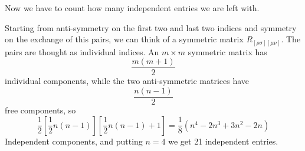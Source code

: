 Now we have to count how many independent entries we are left with.\par
Starting from anti-symmetry on the first two and last two indices and symmetry on the exchange of this pairs, we can think of a symmetric matrix $R_{[\rho \sigma ][\mu \nu ]}$. The pairs are thought as individual indices. An $m\times m$ symmetric matrix has 
\[
\frac{m\left( m+1 \right)}{2}
\]
individual components, while the two anti-symmetric matrices have
\[
\frac{n\left( n-1 \right)}{2}
\]
free components, so
\[
	\frac{1}{2} \left[ \frac{1}{2} n\left( n-1 \right)\right] \left[ \frac{1}{2} n \left( n-1 \right)+1\right] = \frac{1}{8} \left( n^{4} -2n^{3} +3n^{2} -2n \right)
\]
Independent components, and putting $n=4$ we get 21 independent entries.

